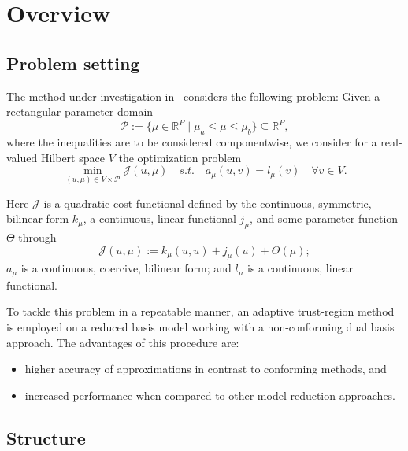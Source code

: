 \section{Overview}

\subsection{Problem setting}

The method under investigation in~\cite{Keil2021} considers the following problem: Given a rectangular parameter domain
\begin{equation*}\label{ParRect}
    \mathcal{P} := \{ \mu \in \mathbb{R}^P \; | \; \mu_a \leq \mu \leq \mu_b \} \subseteq \mathbb{R}^P,
\end{equation*}
where the inequalities are to be considered componentwise, we consider for a real-valued Hilbert space $V$ the optimization problem
\begin{equation*}\label{SettingOpti}
    \min\limits_{(u, \mu) \in V \times \mathcal{P}} \mathcal{J}(u, \mu) \quad s.t. \quad a_\mu(u, v) = l_\mu(v) \quad \forall v \in V.
\end{equation*}

Here $\mathcal{J}$ is a quadratic cost functional defined by the continuous, symmetric, bilinear form $k_\mu$, a continuous, linear functional $j_\mu$, and some parameter function $\Theta$ through
\begin{equation*}
    \mathcal{J}(u, \mu) := k_\mu(u, u) + j_\mu(u) + \Theta(\mu);
\end{equation*}
$a_\mu$ is a continuous, coercive, bilinear form; and $l_\mu$ is a continuous, linear functional.

To tackle this problem in a repeatable manner, an adaptive trust-region method is employed on a reduced basis model working with a non-conforming dual basis approach.
The advantages of this procedure are:
\begin{itemize}
    \item higher accuracy of approximations in contrast to conforming methods, and
    \item increased performance when compared to other model reduction approaches.
\end{itemize}

\subsection{Structure}

